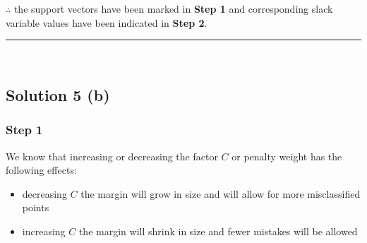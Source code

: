 \documentclass{article}
\begin{document}
\subsubsection*{\normalfont}{$\therefore$ the support vectors have been marked in \textbf{Step 1} and corresponding slack variable values have been indicated in \textbf{Step 2}.}

\noindent\rule{\textwidth}{0.4pt}\\

\newpage

\subsection*{Solution 5 (b)}
\subsubsection*{Step 1}
\parbox{\textwidth}{
We know that increasing or decreasing the factor $C$ or penalty weight has the following effects:
\begin{itemize}
  \item decreasing $C$ the margin will grow in size and will allow for more misclassified points
  \item increasing $C$ the margin will shrink in size and fewer mistakes will be allowed
\end{itemize}
}
\end{document}
